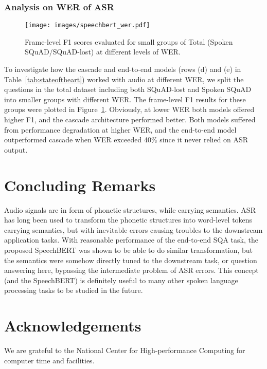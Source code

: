 \documentclass[a4paper]{article}
\begin{document}
\vspace{-10pt}
\subsubsection{Analysis on WER of ASR}
\label{ssec:ea}

\begin{figure}[t!]
    \centering
    \texttt{[image: images/speechbert\_wer.pdf]}
    \caption{Frame-level F1 scores evaluated for small groups of Total (Spoken SQuAD/SQuAD-lost) at different levels of WER.}
    \label{fig:emratio}
    \vspace{-15pt}
\end{figure}

\vspace{-5pt}
To investigate how the cascade and end-to-end models (rows (d) and (e) in Table~\ref{tab:stateoftheart}) worked with audio at different WER, we split the questions in the total dataset including both SQuAD-lost and Spoken SQuAD into smaller groups with different WER. The frame-level F1 results for these groups were plotted in Figure~\ref{fig:emratio}. Obviously, at lower WER both models offered higher F1, and the cascade architecture performed better. Both models suffered from performance degradation at higher WER, and the end-to-end model outperformed cascade when WER exceeded 40\% since it never relied on ASR output.


 

\vspace{-5pt}
\section{Concluding Remarks}
\label{sec:conclusions}

\vspace{-5pt}

Audio signals are in form of phonetic structures, while carrying semantics. ASR has long been used to transform the phonetic structures into word-level tokens carrying semantics, but with inevitable errors causing troubles to the downstream application tasks. With reasonable performance of the end-to-end SQA task, the proposed SpeechBERT was shown to be able to do similar transformation, but the semantics were somehow directly tuned to the downstream task, or question answering here, bypassing the intermediate problem of ASR errors. This concept (and the SpeechBERT) is definitely useful to many other spoken language processing tasks to be studied in the future.









 
\section{Acknowledgements}

We are grateful to the National Center for High-performance Computing for computer time and facilities.



\end{document}
